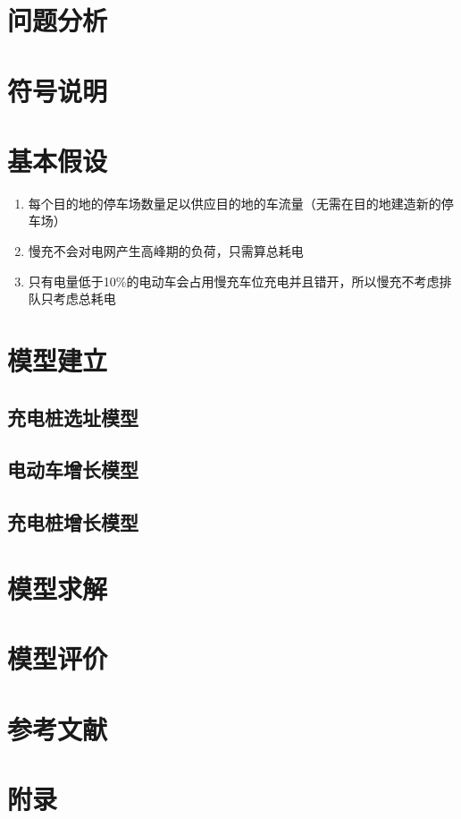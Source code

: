 \documentclass[12pt, a4paper, oneside]{ctexart}
\begin{document}
    \section{问题分析}
    
    \section{符号说明}

    \section{基本假设}
    \begin{enumerate}
        \item 每个目的地的停车场数量足以供应目的地的车流量（无需在目的地建造新的停车场）
        \item 慢充不会对电网产生高峰期的负荷，只需算总耗电
        \item 只有电量低于10\%的电动车会占用慢充车位充电并且错开，所以慢充不考虑排队只考虑总耗电
    \end{enumerate}

    \section{模型建立}
    \subsection{充电桩选址模型}

    \subsection{电动车增长模型}

    \subsection{充电桩增长模型}

    \section{模型求解}

    \section{模型评价}

    \section{参考文献}

    \section{附录}
\end{document}
